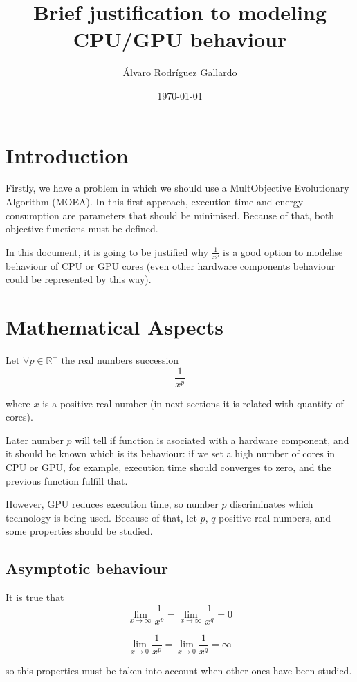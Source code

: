 \documentclass{article}
\title{Brief justification to modeling CPU/GPU behaviour}
\author{Álvaro Rodríguez Gallardo}
\date{\today}
\begin{document}
\maketitle

\section{Introduction}

Firstly, we have a problem in which we should use a MultObjective Evolutionary Algorithm (MOEA). In this first approach, execution time and energy consumption are parameters that should be minimised. Because of that, both objective functions must be defined.

In this document, it is going to be justified why \(\frac{1}{{x^p}}\) is a good option to modelise behaviour of CPU or GPU cores (even other hardware components behaviour could be represented by this way).

\section{Mathematical Aspects}

Let \(\forall p \in \mathbb{R^+}\) the real numbers succession 
\[
\frac{1}{{x^p}}
\]

where \(x\) is a positive real number (in next sections it is related with quantity of cores).

Later number \(p\) will tell if function is asociated with a hardware component, and it should be known which is its behaviour: if we set a high number of cores in CPU or GPU, for example, execution time should converges to zero, and the previous function fulfill that.

However, GPU reduces execution time, so number \(p\) discriminates which technology is being used. Because of that, let \(p\), \(q\) positive real numbers, and some properties should be studied.

\subsection{Asymptotic behaviour}

It is true that
\[
\lim_{{x \to \infty}} \frac{1}{{x^p}}=\lim_{{x \to \infty}} \frac{1}{{x^q}}=0
\]

\[
\lim_{{x \to 0}} \frac{1}{{x^p}}=\lim_{{x \to 0}} \frac{1}{{x^q}}=\infty
\]

so this properties must be taken into account when other ones have been studied.
\end{document}
